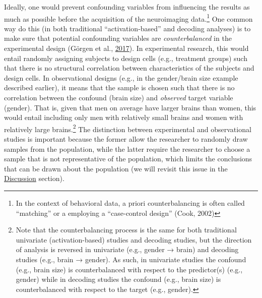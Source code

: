 \documentclass[12pt,american,a4paper,oneside,]{memoir} %
\let\rmarkdownfootnote\footnote%
\def\footnote{\protect\rmarkdownfootnote}
\begin{document}
Ideally, one would prevent confounding variables from influencing the results as much as possible before the acquisition of the neuroimaging data.\footnote{In the context of behavioral data, a priori counterbalancing is often called ``matching'' or a employing a ``case-control design'' (Cook, 2002)} One common way do this (in both traditional ``activation-based'' and decoding analyses) is to make sure that potential confounding variables are \emph{counterbalanced} in the experimental design (Görgen et al., \protect\hyperlink{ref-Gorgen2017-sy}{2017}). In experimental research, this would entail randomly assigning subjects to design cells (e.g., treatment groups) such that there is no structural correlation between characteristics of the subjects and design cells. In observational designs (e.g., in the gender/brain size example described earlier), it means that the sample is chosen such that there is no correlation between the confound (brain size) and \emph{observed} target variable (gender). That is, given that men on average have larger brains than women, this would entail including only men with relatively small brains and women with relatively large brains.\footnote{Note that the counterbalancing process is the same for both traditional univariate (activation-based) studies and decoding studies, but the direction of analysis is reversed in univariate (e.g., gender → brain) and decoding studies (e.g., brain → gender). As such, in univariate studies the confound (e.g., brain size) is counterbalanced with respect to the predictor(s) (e.g., gender) while in decoding studies the confound (e.g., brain size) is counterbalanced with respect to the target (e.g., gender).} The distinction between experimental and observational studies is important because the former allow the researcher to randomly draw samples from the population, while the latter require the researcher to choose a sample that is not representative of the population, which limits the conclusions that can be drawn about the population (we will revisit this issue in the \protect\hyperlink{confounds-decoding-discussion}{Discussion} section).
\end{document}
